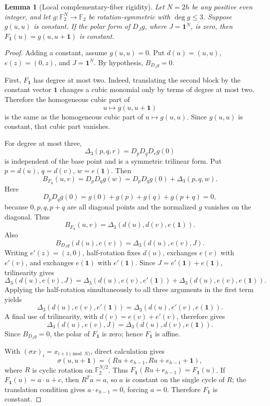 \documentclass[11pt,a4paper]{article}
\newtheorem{lemma}[theorem]{Lemma}
\theoremstyle{remark}
\theoremstyle{plain}
\newcommand{\F}{\mathbb F_2}
\begin{document}
\begin{lemma}[Local complementary-fiber rigidity]\label{lem:fiber-rigidity}
Let \(N=2h\) be any positive even integer, and let \(g:\F^N\to\F\) be rotation-symmetric with \(\deg g\le3\). Suppose \(g(u,u)\) is constant. If the polar form of \(D_Jg\), where \(J=\mathbf1^N\), is zero, then \(F_{\mathbf1}(u)=g(u,u+\mathbf1)\) is constant.
\end{lemma}
\begin{proof}
Adding a constant, assume \(g(u,u)=0\). Put \(d(u)=(u,u)\), \(e(z)=(0,z)\), and \(J=\mathbf1^N\). By hypothesis, \(B_{D_Jg}=0\).

First, $F_{\mathbf1}$ has degree at most two. Indeed, translating the second block by the constant vector $\mathbf1$ changes a cubic monomial only by terms of degree at most two. Therefore the homogeneous cubic part of
\[
u\longmapsto g(u,u+\mathbf1)
\]
is the same as the homogeneous cubic part of $u\mapsto g(u,u)$. Since $g(u,u)$ is constant, that cubic part vanishes.

For degree at most three,
\[
\Delta_3(p,q,r)=D_pD_qD_rg(0)
\]
is independent of the base point and is a symmetric trilinear form. Put \(p=d(u)\), \(q=d(v)\), \(w=e(\mathbf1)\). Then
\[
B_{F_{\mathbf1}}(u,v)=D_pD_qg(w)
=D_pD_qg(0)+\Delta_3(p,q,w).
\]
Here
\[
D_pD_qg(0)=g(0)+g(p)+g(q)+g(p+q)=0,
\]
because \(0,p,q,p+q\) are all diagonal points and the normalized \(g\) vanishes on the diagonal. Thus
\[
B_{F_{\mathbf1}}(u,v)=\Delta_3(d(u),d(v),e(\mathbf1)).
\]
Also
\[
B_{D_Jg}(d(u),e(v))=\Delta_3(d(u),e(v),J).
\]
Writing \(e'(z)=(z,0)\), half-rotation fixes \(d(u)\), exchanges \(e(v)\) with \(e'(v)\), and exchanges \(e(\mathbf1)\) with \(e'(\mathbf1)\). Since \(J=e'(\mathbf1)+e(\mathbf1)\), trilinearity gives
\[
\Delta_3(d(u),e(v),J)
=\Delta_3(d(u),e(v),e'(\mathbf1))
 +\Delta_3(d(u),e(v),e(\mathbf1)).
\]
Applying the half-rotation simultaneously to all three arguments in the first term yields
\[
\Delta_3(d(u),e(v),e'(\mathbf1))
=\Delta_3(d(u),e'(v),e(\mathbf1)).
\]
A final use of trilinearity, with \(d(v)=e(v)+e'(v)\), therefore gives
\[
\Delta_3(d(u),e(v),J)
=\Delta_3(d(u),d(v),e(\mathbf1)).
\]
Since \(B_{D_Jg}=0\), the polar of \(F_{\mathbf1}\) is zero; hence \(F_{\mathbf1}\) is affine.

With \((\sigma x)_i=x_{i+1\pmod N}\), direct calculation gives
\[
\sigma(u,u+\mathbf1)=(Ru+e_{h-1},Ru+e_{h-1}+\mathbf1),
\]
where \(R\) is cyclic rotation on \(\F^{N/2}\). Thus \(F_{\mathbf1}(Ru+e_{h-1})=F_{\mathbf1}(u)\). If \(F_{\mathbf1}(u)=a\cdot u+c\), then \(R^Ta=a\), so \(a\) is constant on the single cycle of \(R\); the translation condition gives \(a\cdot e_{h-1}=0\), forcing \(a=0\). Therefore \(F_{\mathbf1}\) is constant.
\end{proof}
\end{document}
